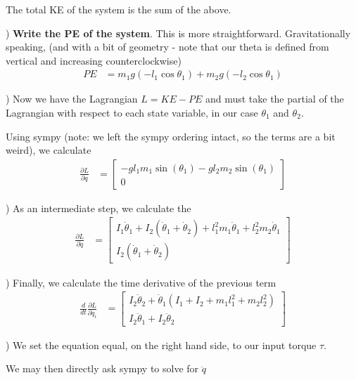 \documentclass[conference]{IEEEtran}
\begin{document}
The total KE of the system is the sum of the above.

) \textbf{Write the PE of the system}. This is more straightforward. Gravitationally
speaking, (and with a bit of geometry - note that our theta is defined from
vertical and increasing counterclockwise)
\begin{align}
    PE &= m_1 g (- l_1 \cos\theta_1) + m_2 g (- l_2 \cos\theta_1)
\end{align}

) Now we have the Lagrangian $L = KE - PE$ and must take the partial of the Lagrangian with
respect to each state variable, in our case $\theta_1$ and $\theta_2$.

Using sympy (note: we left the sympy ordering intact, so the terms are a
bit weird), we calculate
\begin{align}
    \frac{\partial L}{\partial q} &=
    \begin{bmatrix}
        -g l_1 m_1 \sin(\theta_1) - g l_2 m_2 \sin(\theta_1) \\
        0
    \end{bmatrix}
    \label{eq:partialq}
\end{align}

) As an intermediate step, we calculate the
\begin{align}
    \frac{\partial L}{\partial \dot q} &=
    \begin{bmatrix}
        I_1 \dot\theta_1 + I_2 (\dot\theta_1 + \dot\theta_2) +
            l_1^2 m_1 \dot\theta_1 + l_2^2 m_2 \dot \theta_1 \\
            I_2 (\dot \theta_1 + \dot\theta_2)
    \end{bmatrix}
    \label{eq:partialqdot}
\end{align}

) Finally, we calculate the time derivative of the previous term
\begin{align}
    \frac{d}{dt} \frac{\partial L}{\partial \dot q_i} &=
    \begin{bmatrix}
    I_2 \ddot\theta_2 + \ddot\theta_1 ( I_1 +  I_2 +  m_1 l_1^2 + m_2 l_2^2) \\
    I_2 \ddot\theta_1 + I_2 \ddot\theta_2
    \end{bmatrix}
    \label{eq:ddt}
\end{align}

) We set the equation equal, on the right hand side, to our input torque $\tau$.

We may then directly ask sympy to solve for $\ddot q$
\end{document}
